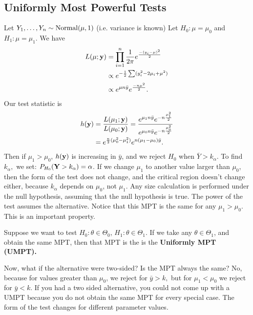 
\subsection{Uniformly Most Powerful Tests}
\begin{eg}
Let $Y_1,\dots,Y_n\sim \operatorname*{Normal}(\mu,1)$ (i.e. variance is known) Let $H_0: \mu = \mu_0$ and $H_1:\mu = \mu_1$. We have
\begin{align*}
	L(\mu;\mathbf y)&=\prod^n_{i=1}\frac{1}{2\pi}e^{\frac{-(y_i-\mu)^2}{2}} \\
		  & \propto e^{-\frac{1}{2}\sum(y_i^2-2\mu_i+\mu^2)} \\
		  & \propto e^{\mu n \bar{y}}e^{\frac{-n\mu^2}{2}}
.\end{align*}
Our test statistic is 
\begin{align*}
h(\mathbf y)&=\frac{L(\mu_1;\mathbf y)}{L(\mu_0;\mathbf y)}=\frac{e^{\mu_1n\bar{y}}e^{-n\frac{\mu_1^2}{2}}}{e^{\mu_0n\bar{y}}e^{-n\frac{\mu_0^2}{2}}} \\
	      &=e^{\frac{n}{2}(\mu_0^2-\mu_1^2)}e^{n(\mu_1-\mu_0)\bar{y}}  
.\end{align*}
Then if $\mu_1>\mu_0$, $h(\mathbf y)$ is increasing in $\bar{y}$, and we reject $H_0$ when $\bar{Y}>k_\alpha$. To find $k_\alpha,$ we set: $P_{H_0}(\mathbf Y> k_\alpha)=\alpha$. If we change $\mu_1$ to another value larger than $\mu_0$, then the form of the test does not change, and the critical region doesn't change either, because $k_\alpha$ depends on $\mu_0$, not $\mu_1$. Any size calculation is performed under the null hypothesis, assuming that the null hypothesis is true. The power of the test assumes the alternative. Notice that this MPT is the same for any $\mu_1>\mu_0$. This is an important property.
\end{eg}

\begin{definition}
	Suppose we want to test $H_0: \theta\in\Theta_0$, $H_1:\theta\in \Theta_1$. If we take any $\theta\in \Theta_1$, and obtain the same MPT, then that MPT is the is the \textbf{Uniformly MPT (UMPT).} 
\end{definition}

Now, what if the alternative were two-sided? Is the MPT always the same? No, because for values greater than $\mu_0$, we reject for $\bar{y}>k,$ but for $\mu_1<\mu_0$ we reject for $\bar{y}<k$. If you had a two sided alternative, you could not come up with a UMPT because you do not obtain the same MPT for every special case. The form of the test changes for different parameter values. 

